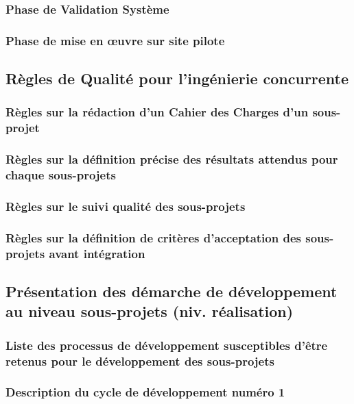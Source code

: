 \documentclass[a4paper]{article}
\begin{document}
\subsubsection{Phase de Validation Système}

\subsubsection{Phase de mise en œuvre sur site pilote}

\subsection{Règles de Qualité pour l'ingénierie concurrente}

\subsubsection{Règles sur la rédaction d'un Cahier des Charges d'un sous-projet}

\subsubsection{Règles sur la définition précise des résultats attendus pour chaque sous-projets}

\subsubsection{Règles sur le suivi qualité des sous-projets}

\subsubsection{Règles sur la définition de critères d'acceptation des sous-projets avant intégration}

\subsection{Présentation des démarche de développement au niveau sous-projets (niv. réalisation)}

\subsubsection{Liste des processus de développement susceptibles d'être retenus pour le développement des sous-projets}

\subsubsection{Description du cycle de développement numéro 1}
\end{document}

